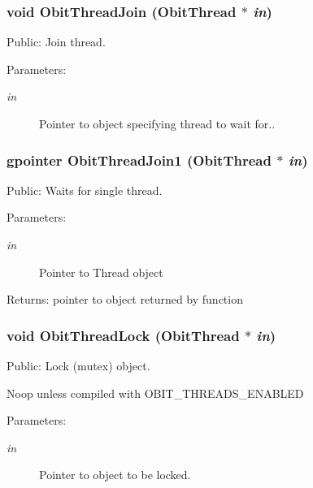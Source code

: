 \subsubsection{\setlength{\rightskip}{0pt plus 5cm}void Obit\-Thread\-Join ({\bf Obit\-Thread} $\ast$ {\em in})}\label{ObitThread_8h_a15}


Public: Join thread. 

\begin{Desc}
\item[Parameters:]
\begin{description}
\item[{\em in}]Pointer to object specifying thread to wait for.. \end{description}
\end{Desc}
\subsubsection{\setlength{\rightskip}{0pt plus 5cm}gpointer Obit\-Thread\-Join1 ({\bf Obit\-Thread} $\ast$ {\em in})}\label{ObitThread_8h_a26}


Public: Waits for single thread. 

\begin{Desc}
\item[Parameters:]
\begin{description}
\item[{\em in}]Pointer to Thread object \end{description}
\end{Desc}
\begin{Desc}
\item[Returns:]pointer to object returned by function \end{Desc}
\subsubsection{\setlength{\rightskip}{0pt plus 5cm}void Obit\-Thread\-Lock ({\bf Obit\-Thread} $\ast$ {\em in})}\label{ObitThread_8h_a6}


Public: Lock (mutex) object. 

Noop unless compiled with OBIT\_\-THREADS\_\-ENABLED \begin{Desc}
\item[Parameters:]
\begin{description}
\item[{\em in}]Pointer to object to be locked. \end{description}
\end{Desc}
